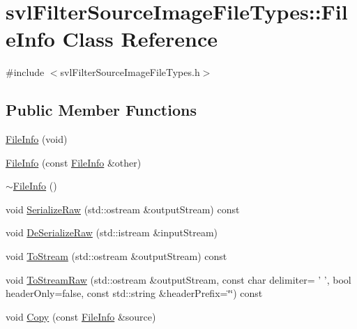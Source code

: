\hypertarget{classsvl_filter_source_image_file_types_1_1_file_info}{\section{svl\-Filter\-Source\-Image\-File\-Types\-:\-:File\-Info Class Reference}
\label{classsvl_filter_source_image_file_types_1_1_file_info}
}


{\ttfamily \#include $<$svl\-Filter\-Source\-Image\-File\-Types.\-h$>$}

\subsection*{Public Member Functions}
\begin{DoxyCompactItemize}
\item 
\hyperlink{classsvl_filter_source_image_file_types_1_1_file_info_a336686357196062683dd68ab639876db}{File\-Info} (void)
\item 
\hyperlink{classsvl_filter_source_image_file_types_1_1_file_info_a66aa1d8089aa327dab3965355f1aa9f0}{File\-Info} (const \hyperlink{classsvl_filter_source_image_file_types_1_1_file_info}{File\-Info} \&other)
\item 
\hyperlink{classsvl_filter_source_image_file_types_1_1_file_info_a13dc99ad9ee9125900c948b5bfa6f11d}{$\sim$\-File\-Info} ()
\item 
void \hyperlink{classsvl_filter_source_image_file_types_1_1_file_info_ab03f91c5f4b127ad8de7a2c8c0fc784c}{Serialize\-Raw} (std\-::ostream \&output\-Stream) const 
\item 
void \hyperlink{classsvl_filter_source_image_file_types_1_1_file_info_a089776ea7f9c7caa168082b0ef4b9eb7}{De\-Serialize\-Raw} (std\-::istream \&input\-Stream)
\item 
void \hyperlink{classsvl_filter_source_image_file_types_1_1_file_info_a9c8f20c39693da32b003a5b732d81819}{To\-Stream} (std\-::ostream \&output\-Stream) const 
\item 
void \hyperlink{classsvl_filter_source_image_file_types_1_1_file_info_a89a0e6461a33f3eb9c07af622037d518}{To\-Stream\-Raw} (std\-::ostream \&output\-Stream, const char delimiter= ' ', bool header\-Only=false, const std\-::string \&header\-Prefix=\char`\"{}\char`\"{}) const 
\item 
void \hyperlink{classsvl_filter_source_image_file_types_1_1_file_info_a09dcc6ec7afb086957a6370ee80b4fb3}{Copy} (const \hyperlink{classsvl_filter_source_image_file_types_1_1_file_info}{File\-Info} \&source)

\end{DoxyCompactItemize}
